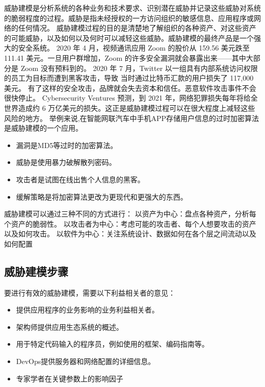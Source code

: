 威胁建模是分析系统的各种业务和技术要求、识别潜在威胁并记录这些威胁对系统的脆弱程度的过程。威胁是指未经授权的一方访问组织的敏感信息、应用程序或网络的任何情况。 
威胁建模过程的目的是清楚地了解组织的各种资产、对这些资产的可能威胁，以及如何以及何时可以减轻这些威胁。威胁建模的最终产品是一个强大的安全系统。 
2020 年 4 月，视频通讯应用 Zoom 的股价从 159.56 美元跌至 111.41 美元。一旦用户群增加，Zoom 的许多安全漏洞就会暴露出来——其中大部分是 Zoom 没有预料到的。
2020 年 7 月，Twitter 以一组具有内部系统访问权限的员工为目标而遭到黑客攻击，导致 当时通过比特币汇款的用户损失了 117,000 美元。 
有了这样的安全攻击，品牌就会失去资本和信任。恶意软件攻击事件不会很快停止。
Cyber​​security Ventures 预测\cite{apache1}，到 2021 年，网络犯罪损失每年将给全世界造成约 6 万亿美元的损失。这正是威胁建模过程可以在很大程度上减轻这些风险的地方。 
\newline
举例来说,在智能网联汽车中手机APP存储用户信息的过时加密算法是威胁建模的一个应用。
\begin{itemize}
    \item 漏洞是MD5等过时的加密算法。
    \item 威胁是使用暴力破解散列密码。
    \item 攻击者是试图在线出售个人信息的黑客。
    \item 缓解策略是将加密算法更改为更现代和更强大的东西。
  \end{itemize}
威胁建模可以通过三种不同的方式进行： 
\newline
以资产为中心：盘点各种资产，分析每个资产的脆弱性。
\newline 
以攻击者为中心：考虑可能的攻击者、每个人想要攻击的资产以及如何攻击。
\newline
以软件为中心：关注系统设计、数据如何在各个层之间流动以及如何配置
\subsection{威胁建模步骤}
要进行有效的威胁建模，需要以下利益相关者的意见：
\begin{itemize}
    \item 提供应用程序的业务影响的业务利益相关者。
    \item 架构师提供应用生态系统的概述。
    \item 用于特定代码输入的程序员，例如使用的框架、编码指南等。
    \item DevOps提供服务器和网络配置的详细信息。
    \item 专家学者在关键参数上的影响因子
  \end{itemize}

